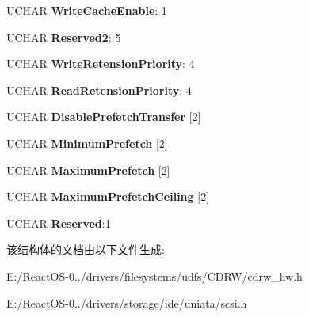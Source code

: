 \begin{DoxyCompactItemize}
U\+C\+H\+AR {\bfseries Write\+Cache\+Enable}\+: 1
\item 
\mbox{\label{struct___m_o_d_e___c_a_c_h_i_n_g___p_a_g_e_a4ece4e98b3d9124d1c89888b1b1d9331}} 
U\+C\+H\+AR {\bfseries Reserved2}\+: 5
\item 
\mbox{\label{struct___m_o_d_e___c_a_c_h_i_n_g___p_a_g_e_a6229742aeceb2686c56b49e2758b4aae}} 
U\+C\+H\+AR {\bfseries Write\+Retension\+Priority}\+: 4
\item 
\mbox{\label{struct___m_o_d_e___c_a_c_h_i_n_g___p_a_g_e_a93c9e25e8b5d0f177bb2c030f42bd7a5}} 
U\+C\+H\+AR {\bfseries Read\+Retension\+Priority}\+: 4
\item 
\mbox{\label{struct___m_o_d_e___c_a_c_h_i_n_g___p_a_g_e_af14d4c2c732bd84b116a894968ee5da6}} 
U\+C\+H\+AR {\bfseries Disable\+Prefetch\+Transfer} \mbox{[}2\mbox{]}
\item 
\mbox{\label{struct___m_o_d_e___c_a_c_h_i_n_g___p_a_g_e_a5e9f424a09c45ea0250eaaa388eb3308}} 
U\+C\+H\+AR {\bfseries Minimum\+Prefetch} \mbox{[}2\mbox{]}
\item 
\mbox{\label{struct___m_o_d_e___c_a_c_h_i_n_g___p_a_g_e_afbe86436f4e566be3d569e857081f203}} 
U\+C\+H\+AR {\bfseries Maximum\+Prefetch} \mbox{[}2\mbox{]}
\item 
\mbox{\label{struct___m_o_d_e___c_a_c_h_i_n_g___p_a_g_e_ac66c757e76c5ff082de34f0f696917c3}} 
U\+C\+H\+AR {\bfseries Maximum\+Prefetch\+Ceiling} \mbox{[}2\mbox{]}
\item 
\mbox{\label{struct___m_o_d_e___c_a_c_h_i_n_g___p_a_g_e_a21a9f42f8bbec966ef0177edf15ef601}} 
U\+C\+H\+AR {\bfseries Reserved}\+:1
\end{DoxyCompactItemize}


该结构体的文档由以下文件生成\+:\begin{DoxyCompactItemize}
\item 
E\+:/\+React\+O\+S-\/0../drivers/filesystems/udfs/\+C\+D\+R\+W/cdrw\+\_\+hw.\+h\item 
E\+:/\+React\+O\+S-\/0../drivers/storage/ide/uniata/scsi.\+h\end{DoxyCompactItemize}
